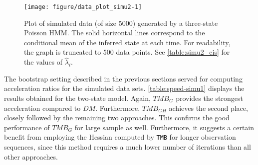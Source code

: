 \documentclass[bimj,fleqn]{w-art}\usepackage[]{graphicx}\usepackage[]{color}
\makeatletter
\def\maxwidth{ %
  \ifdim\Gin@nat@width>\linewidth
    \linewidth
  \else
    \Gin@nat@width
  \fi
}
\newenvironment{knitrout}{}{} %
\theoremstyle{plain}
\theoremstyle{definition}
\makeatother
\begin{document}
\begin{knitrout}
\color{fgcolor}\begin{figure}[htb]

{\centering \texttt{[image: figure/data\_plot\_simu2-1]} 

}

\caption{Plot of simulated data (of size 5000) generated by a three-state Poisson HMM. The solid horizontal lines correspond to the conditional mean of the inferred state at each time. For readability, the graph is truncated to 500 data points. See \autoref{table:simu2_cis} for the values of $\widehat{\lambda}_i$.}\label{fig:data_plot_simu2}
\end{figure}

\end{knitrout}



The bootstrap setting described in the previous sections served for computing acceleration ratios for the simulated data sets. \autoref{table:speed-simu1} displays the results obtained for the two-state model. Again, $TMB_G$ provides the strongest acceleration compared to $DM$. Furthermore, $TMB_{GH}$ achieves the second place, closely followed by the remaining two approaches. This confirms the good performance of $TMB_G$ for large sample as well. Furthermore, it suggests a certain benefit from employing the Hessian computed by {\tt TMB} for longer observation sequences, since this method requires a much lower number of iterations than all other approaches.
\end{document}
